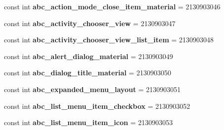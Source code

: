 \begin{DoxyCompactItemize}
\item 
\hypertarget{classClient_1_1Droid_1_1Resource_1_1Layout_aeb4d32850a84681acb890dc246406457}{}const int {\bfseries abc\+\_\+action\+\_\+mode\+\_\+close\+\_\+item\+\_\+material} = 2130903046\label{classClient_1_1Droid_1_1Resource_1_1Layout_aeb4d32850a84681acb890dc246406457}

\item 
\hypertarget{classClient_1_1Droid_1_1Resource_1_1Layout_a80d8d1a28042e1c890e0c2201e875216}{}const int {\bfseries abc\+\_\+activity\+\_\+chooser\+\_\+view} = 2130903047\label{classClient_1_1Droid_1_1Resource_1_1Layout_a80d8d1a28042e1c890e0c2201e875216}

\item 
\hypertarget{classClient_1_1Droid_1_1Resource_1_1Layout_a89944144f873b5018ce74b6b0e5a20d6}{}const int {\bfseries abc\+\_\+activity\+\_\+chooser\+\_\+view\+\_\+list\+\_\+item} = 2130903048\label{classClient_1_1Droid_1_1Resource_1_1Layout_a89944144f873b5018ce74b6b0e5a20d6}

\item 
\hypertarget{classClient_1_1Droid_1_1Resource_1_1Layout_a12cba73c3abcabe6727bbfc5cbbe92d3}{}const int {\bfseries abc\+\_\+alert\+\_\+dialog\+\_\+material} = 2130903049\label{classClient_1_1Droid_1_1Resource_1_1Layout_a12cba73c3abcabe6727bbfc5cbbe92d3}

\item 
\hypertarget{classClient_1_1Droid_1_1Resource_1_1Layout_a52655b5a00fd747c09c4d13017796cdf}{}const int {\bfseries abc\+\_\+dialog\+\_\+title\+\_\+material} = 2130903050\label{classClient_1_1Droid_1_1Resource_1_1Layout_a52655b5a00fd747c09c4d13017796cdf}

\item 
\hypertarget{classClient_1_1Droid_1_1Resource_1_1Layout_a09555d1b80de08203297a1b34b86b512}{}const int {\bfseries abc\+\_\+expanded\+\_\+menu\+\_\+layout} = 2130903051\label{classClient_1_1Droid_1_1Resource_1_1Layout_a09555d1b80de08203297a1b34b86b512}

\item 
\hypertarget{classClient_1_1Droid_1_1Resource_1_1Layout_afafa49cc05bf7f4536436b534ab8d935}{}const int {\bfseries abc\+\_\+list\+\_\+menu\+\_\+item\+\_\+checkbox} = 2130903052\label{classClient_1_1Droid_1_1Resource_1_1Layout_afafa49cc05bf7f4536436b534ab8d935}

\item 
\hypertarget{classClient_1_1Droid_1_1Resource_1_1Layout_ad619091314a62da6210db172af7d2f2c}{}const int {\bfseries abc\+\_\+list\+\_\+menu\+\_\+item\+\_\+icon} = 2130903053\label{classClient_1_1Droid_1_1Resource_1_1Layout_ad619091314a62da6210db172af7d2f2c}


\end{DoxyCompactItemize}
